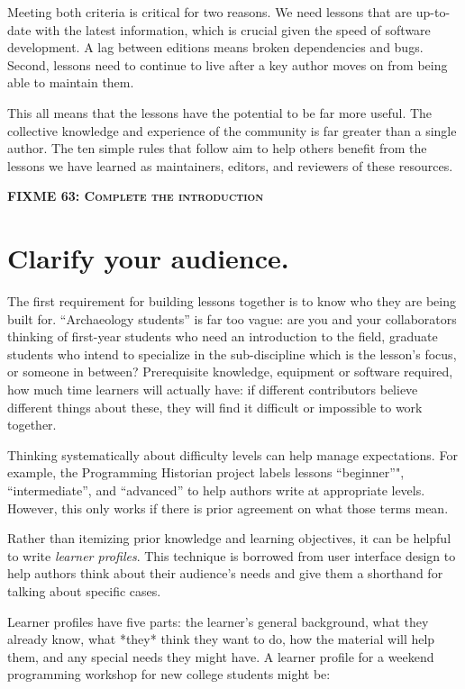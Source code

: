 \documentclass[10pt,letterpaper]{article}
\newcommand{\fixme}[2]{\textsc{\textbf{FIXME {#1}: {#2}}}}
\newcommand{\rulemajor}[1]{\section{#1}}
\begin{document}
Meeting both criteria is critical for two reasons.
We need lessons that are up-to-date with the latest information,
which is crucial given the speed of software development.
A lag between editions means broken dependencies and bugs.
Second,
lessons need to continue to live after a key author moves on
from being able to maintain them.

This all means that the lessons have the potential to be far more useful.
The collective knowledge and experience of the community
is far greater than a single author. The ten simple rules
that follow aim to help others benefit from the
lessons we have learned as maintainers, editors, and reviewers of
these resources.

\fixme{63}{Complete the introduction}

\rulemajor{Clarify your audience.}

The first requirement for building lessons together is
to know who they are being built for.
``Archaeology students'' is far too vague:
are you and your collaborators thinking of
first-year students who need an introduction to the field,
graduate students who intend to specialize in the sub-discipline which is the lesson's focus,
or someone in between?
Prerequisite knowledge,
equipment or software required,
how much time learners will actually have:
if different contributors believe different things about these,
they will find it difficult or impossible to work together.

Thinking systematically about difficulty levels can help manage expectations.
For example,
the Programming Historian project labels lessons ``beginner''",
``intermediate'',
and ``advanced''
to help authors write at appropriate levels.
However,
this only works if there is prior agreement on what those terms mean.

Rather than itemizing prior knowledge and learning objectives,
it can be helpful to write \emph{learner profiles}.
This technique is borrowed from user interface design
to help authors think about their audience's needs
and give them a shorthand for talking about specific cases.

Learner profiles have five parts:
the learner's general background,
what they already know,
what *they* think they want to do,
how the material will help them,
and any special needs they might have.
A learner profile for a weekend programming workshop for new college students might be:
\end{document}

